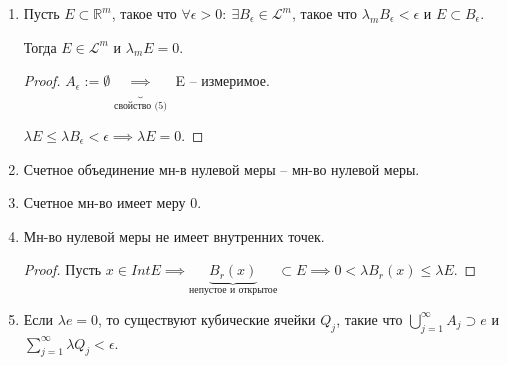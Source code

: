 \begin{properties}
\begin{enumerate}
{            \begin{proof}

                $A := \bigcup_{n=1}^{\infty} A_{\frac{1}{n}} \in \mathscr{L}^m$ и $B := \bigcap_{n=1}^{\infty} B_{\frac{1}{n}} \in \mathscr{L}^m$.

                $A \subset E \subset B$, $B \setminus A \subset B_{\frac{1}{n}} \setminus A_{\frac{1}{n}}$.

                $\lambda_m (B \setminus A) \leq \lambda_m (B_{\frac{1}{n}} \setminus A_{\frac{1}{n}}) < \frac{1}{n} \implies \lambda_m (B \setminus A) = 0$.

                $E \setminus A \subset B \setminus A \implies E \setminus A \in \mathscr{L}^m \implies E = E \setminus A \sqcup A \in \mathscr{L}^m$.
            \end{proof}
        }
        \item {
            Пусть $E \subset \mathbb{R}^m$, такое что $\forall \epsilon > 0: \ \exists B_{\epsilon} \in \mathscr{L}^m$, такое что $\lambda_m B_{\epsilon} < \epsilon$ и $E \subset B_{\epsilon}$.

            Тогда  $E \in \mathscr{L}^m$ и $\lambda_m E = 0$.

            \begin{proof}
                $A_{\epsilon} := \emptyset \underbrace{\implies}_{\text{свойство (5)}}$ E -- измеримое.

                $\lambda E \leq \lambda B_{\epsilon} < \epsilon \implies \lambda E = 0$.
            \end{proof}
        }
        \item {
            Счетное объединение мн-в нулевой меры -- мн-во нулевой меры.
        }
        \item {
            Счетное мн-во имеет меру 0.
        }
        \item {
            Мн-во нулевой меры не имеет внутренних точек.

            \begin{proof}
                Пусть $x \in Int E \implies \underbrace{B_r(x)}_{\text{непустое и открытое}} \subset E \implies 0 < \lambda B_r(x) \leq \lambda E$.
            \end{proof}
        }
        \item {
            Если $\lambda e = 0$, то существуют кубические ячейки $Q_j$, такие что $\bigcup_{j=1}^{\infty}A_j \supset e$ и $\sum_{j=1}^{\infty} \lambda Q_j < \epsilon$.

}
\end{enumerate}
\end{properties}
